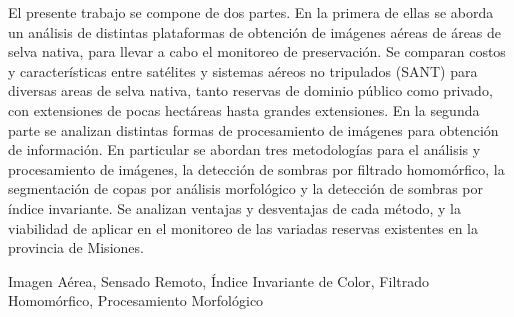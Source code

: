 
El presente trabajo se compone de dos partes. En la primera de ellas se aborda un análisis de distintas plataformas de obtención de imágenes aéreas de áreas de selva nativa, para llevar a cabo el monitoreo de preservación. Se comparan costos y características entre satélites y sistemas aéreos no tripulados (SANT) para diversas areas de selva nativa, tanto reservas de dominio público como privado, con extensiones de pocas hectáreas hasta grandes extensiones. En la segunda parte se analizan distintas formas de procesamiento de imágenes para obtención de información. En particular se abordan tres metodologías para el análisis y procesamiento de imágenes, la detección de sombras por filtrado homomórfico, la segmentación de copas por análisis morfológico y la detección de sombras por índice invariante. Se analizan ventajas y desventajas de cada método, y la viabilidad de aplicar en el monitoreo de las variadas reservas existentes en la provincia de Misiones.\\
\begin{claves}
    Imagen Aérea, Sensado Remoto, Índice Invariante de Color, Filtrado Homomórfico, Procesamiento Morfológico
\end{claves}    %

